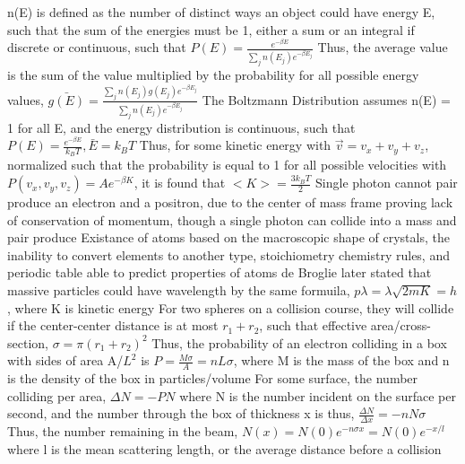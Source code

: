 \documentclass[11 pt, twoside]{article}
\newenvironment{outline*}
{
	\begin{outline}[enumerate]
	}
	{\end{outline}
}
\begin{document}
\begin{outline*}
		\3 n(E) is defined as the number of distinct ways an object could have energy E, such that the sum of the energies must be 1, either a sum or an integral if discrete or continuous, such that $P(E) = \frac{e^{-\beta E}}{\sum_j n(E_j) e^{-\beta E_j}}$
	\2 Thus, the average value is the sum of the value multiplied by the probability for all possible energy values, $\bar{g(E)} = \frac{\sum_j n(E_j)g(E_j)e^{-\beta E_j}}{\sum_j n(E_j)e^{-\beta E_j}}$
	\2 The Boltzmann Distribution assumes n(E) = 1 for all E, and the energy distribution is continuous, such that $P(E) = \frac{e^{-\beta E}}{k_BT}, \bar{E} = k_BT$
	\2 Thus, for some kinetic energy with $\vec{v} = v_x + v_y + v_z$, normalized such that the probability is equal to 1 for all possible velocities with $P(v_x, v_y, v_z) = Ae^{-\beta K}$, it is found that $<K> = \frac{3k_B T}{2}$
\1 Single photon cannot pair produce an electron and a positron, due to the center of mass frame proving lack of conservation of momentum, though a single photon can collide into a mass and pair produce
\1 Existance of atoms based on the macroscopic shape of crystals, the inability to convert elements to another type, stoichiometry chemistry rules, and periodic table able to predict properties of atoms
\1 de Broglie later stated that massive particles could have wavelength by the same formuila, $p\lambda = \lambda \sqrt{2mK} = h$, where K is kinetic energy
\1 For two spheres on a collision course, they will collide if the center-center distance is at most $r_1 + r_2$, such that effective area/cross-section, $\sigma = \pi (r_1 + r_2)^2$
	\2 Thus, the probability of an electron colliding in a box with sides of area A/$L^2$ is $P = \frac{M\sigma}{A} = nL\sigma$, where M is the mass of the box and n is the density of the box in particles/volume
	\2 For some surface, the number colliding per area, $\Delta N = -PN$ where N is the number incident on the surface per second, and the number through the box of thickness x is thus, $\frac{\Delta N}{\Delta x} = -nN\sigma$
	\2 Thus, the number remaining in the beam, $N(x) = N(0)e^{-n\sigma x} = N(0)e^{-x/l}$ where l is the mean scattering length, or the average distance before a collision
\end{outline*}
\end{document}
